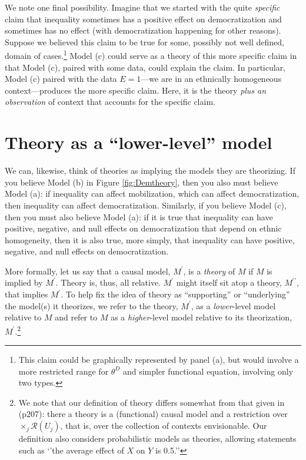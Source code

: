\documentclass[12pt,]{book}
\let\rmarkdownfootnote\footnote%
\def\footnote{\protect\rmarkdownfootnote}
\begin{document}
We note one final possibility. Imagine that we started with the quite \emph{specific} claim that inequality sometimes has a positive effect on democratization and sometimes has no effect (with democratization happening for other reasons). Suppose we believed this claim to be true for some, possibly not well defined, domain of cases.\footnote{This claim could be graphically represented by panel (a), but would involve a more restricted range for \(\theta^D\) and simpler functional equation, involving only two types.} Model (c) could serve as a theory of this more specific claim in that Model (c), paired with some data, could explain the claim. In particular, Model (c) paired with the data \(E=1\)---we are in an ethnically homogeneous context---produces the more specific claim. Here, it is the theory \emph{plus an observation} of context that accounts for the specific claim.

\hypertarget{theory-as-a-lower-level-model}{%
\section{Theory as a ``lower-level'' model}\label{theory-as-a-lower-level-model}}

We can, likewise, think of theories as implying the models they are theorizing. If you believe Model (b) in Figure \ref{fig:Demtheory}, then you also must believe Model (a): if inequality can affect mobilization, which can affect democratization, then inequality can affect democratization. Similarly, if you believe Model (c), then you must also believe Model (a): if it is true that inequality can have positive, negative, and null effects on democratization that depend on ethnic homogeneity, then it is also true, more simply, that inequality can have positive, negative, and null effects on democratization.

More formally, let us say that a causal model, \(M^\prime\), is a \emph{theory} of \(M\) if \(M\) is implied by \(M^\prime\). Theory is, thus, all relative. \(M^\prime\) might itself sit atop a theory, \(M^{\prime\prime}\), that implies \(M^\prime\). To help fix the idea of theory as ``supporting'' or ``underlying'' the model(s) it theorizes, we refer to the theory, \(M^\prime\), as a \emph{lower}-level model relative to \(M\) and refer to \(M\) as a \emph{higher}-level model relative to its theorization, \(M^\prime\).\footnote{We note that our definition of theory differs somewhat from that given in \citet{pearl2009causality} (p207): there a theory is a (functional) causal model and a restriction over \(\times_j \mathcal{R}(U_j)\), that is, over the collection of contexts envisionable. Our definition also considers probabilistic models as theories, allowing statements such as `'the average effect of \(X\) on \(Y\) is 0.5.''}
\end{document}
